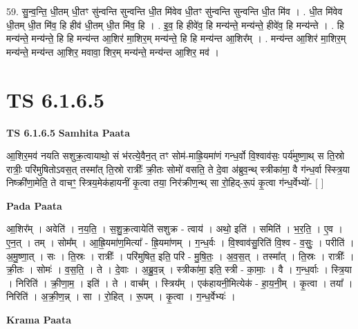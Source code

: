 \documentclass[17pt]{extarticle}
\begin{document}
59. सु॒न्व॒न्ति॒ धी॒तम् धी॒तꣳ सु॑न्वन्ति सुन्वन्ति धी॒त मि॑वेव धी॒तꣳ सु॑न्वन्ति सुन्वन्ति धी॒त मि॑व । . धी॒त मि॑वेव धी॒तम् धी॒त मि॑व॒ हि हीव॑ धी॒तम् धी॒त मि॑व॒ हि । . इ॒व॒ हि हीवे॑व॒ हि मन्य॑न्ते॒ मन्य॑न्ते॒ हीवे॑व॒ हि मन्य॑न्ते । . हि मन्य॑न्ते॒ मन्य॑न्ते॒ हि हि मन्य॑न्त आ॒शिर॑ मा॒शिर॒म् मन्य॑न्ते॒ हि हि मन्य॑न्त आ॒शिर᳚म् । . मन्य॑न्त आ॒शिर॑ मा॒शिर॒म् मन्य॑न्ते॒ मन्य॑न्त आ॒शिर॒ मवावा॒ शिर॒म् मन्य॑न्ते॒ मन्य॑न्त आ॒शिर॒ मव॑ । \newline
\pagebreak
{}

\section{ TS 6.1.6.5 }

\textbf{TS 6.1.6.5 } \newline
\textbf{Samhita Paata} \newline

आ॒शिर॒मव॑ नयति सशुक्र॒त्वायाथो॒ सं भ॑रत्ये॒वैन॒त् तꣳ सोम॑-माह्रि॒यमा॑णं गन्ध॒र्वो वि॒श्वाव॑सः॒ पर्य॑मुष्णा॒थ् स ति॒स्रो रात्रीः॒ परि॑मुषितोऽवस॒त् तस्मा᳚त् ति॒स्रो रात्रीः᳚ क्री॒तः सोमो॑ वसति॒ ते दे॒वा अ॑ब्रुव॒न्थ् स्त्रीका॑मा॒ वै ग॑न्ध॒र्वा स्स्त्रि॒या निष्क्री॑णा॒मेति॒ ते वाचꣳ॒॒ स्त्रिय॒मेक॑हायनीं कृ॒त्वा तया॒ निर॑क्रीण॒न्थ् सा रो॒हिद्-रू॒पं कृ॒त्वा ग॑न्ध॒र्वेभ्यो॑- [  ] \newline

\textbf{Pada Paata} \newline

आ॒शिर᳚म् । अवेति॑ । न॒य॒ति॒ । स॒शु॒क्र॒त्वायेति॑ सशुक्र - त्वाय॑ । अथो॒ इति॑ । समिति॑ । भ॒र॒ति॒ । ए॒व । ए॒न॒त् । तम् । सोम᳚म् । आ॒ह्रि॒यमा॑ण॒मित्या᳚ - ह्रि॒यमा॑णम् । ग॒न्ध॒र्वः । वि॒श्वाव॑सु॒रिति॑ वि॒श्व - व॒सुः॒ । परीति॑ । अ॒मु॒ष्णा॒त् । सः । ति॒स्रः । रात्रीः᳚ । परि॑मुषित॒ इति॒ परि॑ - मु॒षि॒तः॒ । अ॒व॒स॒त् । तस्मा᳚त् । ति॒स्रः । रात्रीः᳚ । क्री॒तः । सोमः॑ । व॒स॒ति॒ । ते । दे॒वाः । अ॒ब्रु॒व॒न्न् । स्त्रीका॑मा॒ इति॒ स्त्री - का॒माः॒ । वै । ग॒न्ध॒र्वाः । स्त्रि॒या । निरिति॑ । क्री॒णा॒म॒ । इति॑ । ते । वाच᳚म् । स्त्रिय᳚म् । एक॑हायनी॒मित्येक॑ - हा॒य॒नी॒म् । कृ॒त्वा । तया᳚ । निरिति॑ । अ॒क्री॒ण॒न्न् । सा । रो॒हित् । रू॒पम् । कृ॒त्वा । ग॒न्ध॒र्वेभ्यः॑ ।  \newline


\textbf{Krama Paata} \newline
\end{document}
